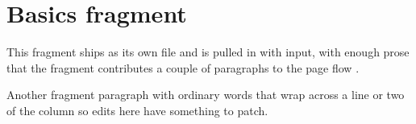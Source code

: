 \section{Basics fragment}

This fragment ships as its own file and is pulled in with input, with enough prose
that the fragment contributes a couple of paragraphs to the page flow \citep{knuth84}.

Another fragment paragraph with ordinary words that wrap across a line or two of the
column so edits here have something to patch.
